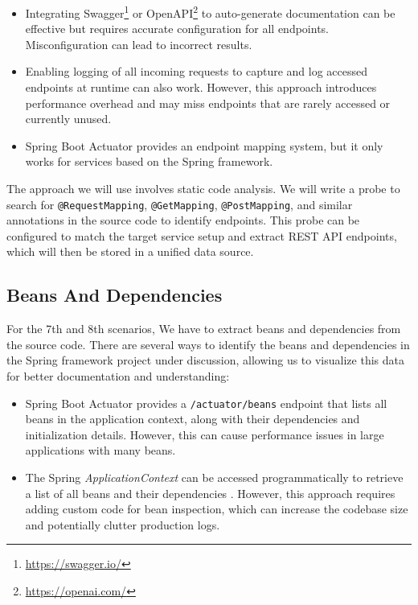 \begin{itemize}
    \item Integrating Swagger\footnote{\url{https://swagger.io/}} or OpenAPI\footnote{\url{https://openai.com/}} to auto-generate documentation can be effective but requires accurate configuration for all endpoints. Misconfiguration can lead to incorrect results.
    \item Enabling logging of all incoming requests to capture and log accessed endpoints at runtime can also work. However, this approach introduces performance overhead and may miss endpoints that are rarely accessed or currently unused.
    \item Spring Boot Actuator provides an endpoint mapping system, but it only works for services based on the Spring framework.
\end{itemize}

The approach we will use involves static code analysis. We will write a probe to search for \texttt{@RequestMapping}, \texttt{@GetMapping}, \texttt{@PostMapping}, and similar annotations in the source code to identify endpoints. This probe can be configured to match the target service setup and extract REST API endpoints, which will then be stored in a unified data source.

\subsection{Beans And Dependencies}

For the 7th and 8th scenarios, We have to extract beans and dependencies from the source code. There are several ways to identify the beans and dependencies in the Spring framework project under discussion, allowing us to visualize this data for better documentation and understanding:

\begin{itemize}
    \item Spring Boot Actuator provides a \texttt{/actuator/beans} endpoint that lists all beans in the application context, along with their dependencies and initialization details. However, this can cause performance issues in large applications with many beans.
    \item The Spring \textit{ApplicationContext} can be accessed programmatically to retrieve a list of all beans and their dependencies \citep{baeldung_applicationcontext}. However, this approach requires adding custom code for bean inspection, which can increase the codebase size and potentially clutter production logs.
\end{itemize}

